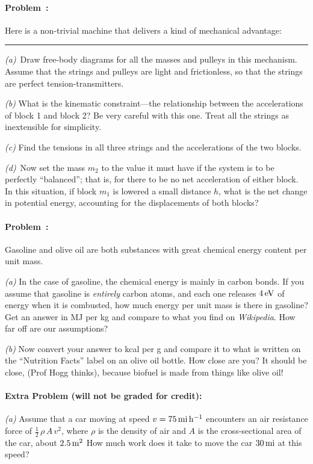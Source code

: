 \documentclass[12pt]{article}
\begin{document}
\paragraph{Problem~\theproblem:}%
Here is a non-trivial machine that delivers a kind of mechanical
advantage:
\\ \rule{0.33\textwidth}{0pt}

\textsl{(a)}~Draw free-body diagrams for all the masses and pulleys in
this mechanism. Assume that the strings and pulleys are light and
frictionless, so that the strings are perfect tension-transmitters.

\textsl{(b)} What is the kinematic constraint---the relationship
between the accelerations of block 1 and block 2? Be very careful with
this one. Treat all the strings as inextensible for simplicity.

\textsl{(c)} Find the tensions in all three strings and the
accelerations of the two blocks.

\textsl{(d)}~Now set the mass $m_2$ to the value it must have if the
system is to be perfectly ``balanced''; that is, for there to be no
net acceleration of either block.  In this situation, if block $m_1$
is lowered a small distance $h$, what is the net change in potential
energy, accounting for the displacements of both blocks?

\paragraph{Problem~\theproblem:}%
Gasoline and olive oil are both substances with great chemical energy
content per unit mass.

\textsl{(a)} In the case of gasoline, the chemical energy is mainly in
carbon bonds.  If you assume that gasoline is \emph{entirely} carbon
atoms, and each one releases $4\,\mathrm{eV}$ of energy when it is combusted, how
much energy per unit mass is there in gasoline?  Get an answer in MJ
per kg and compare to what you find on \textit{Wikipedia}.  How far off
are our assumptions?

\textsl{(b)} Now convert your answer to kcal per g and compare it to
what is written on the ``Nutrition Facts'' label on an olive oil
bottle.  How close are you?  It should be close, (Prof Hogg thinks), because
biofuel is made from things like olive oil!

\paragraph{Extra Problem (will not be graded for credit):}%
\textsl{(a)} Assume that a car moving at speed
$v=75\,\mathrm{mi}\,\mathrm{h}^{-1}$ encounters an air resistance force of
$\frac{1}{2}\,\rho\,A\,v^2$, where $\rho$ is the density of air and $A$ is the
cross-sectional area of the car, about $2.5\,\mathrm{m}^2$ How much work does it
take to move the car $30\,\mathrm{mi}$ at this speed?
\end{document}
